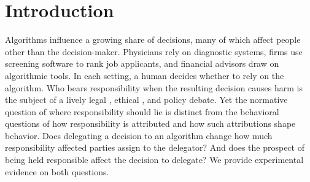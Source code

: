 \section{Introduction} \label{intro}


Algorithms influence a growing share of decisions, many of which affect people other than the decision-maker. Physicians rely on diagnostic systems, firms use screening software to rank job applicants, and financial advisors draw on algorithmic tools. In each setting, a human decides whether to rely on the algorithm. Who bears responsibility when the resulting decision causes harm is the subject of a lively legal \citep{lemley_remedies_2019, buiten_law_2023}, ethical \citep{matthias_responsibility_2004, santoni_de_sio_four_2021}, and policy \citep{european_commission_liability_2019,european_union_ai_act_2024} debate. Yet the normative question of where responsibility should lie is distinct from the behavioral questions of how responsibility is attributed and how such attributions shape behavior. Does delegating a decision to an algorithm change how much responsibility affected parties assign to the delegator? And does the prospect of being held responsible affect the decision to delegate? We provide experimental evidence on both questions.

